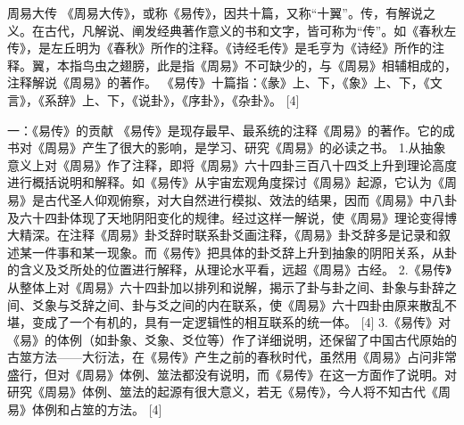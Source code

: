 \documentclass[a4paper,12pt,UTF8,twoside]{ctexbook}
\begin{document}
周易大传
《周易大传》，或称《易传》，因共十篇，又称“十翼”。传，有解说之义。在古代，凡解说、阐发经典著作意义的书和文字，皆可称为“传”。如《春秋左传》，是左丘明为《春秋》所作的注释。《诗经毛传》是毛亨为《诗经》所作的注释。翼，本指鸟虫之翅膀，此是指《周易》不可缺少的，与《周易》相辅相成的，注释解说《周易》的著作。
《易传》十篇指：《彖》上、下，《象》上、下，《文言》，《系辞》上、下，《说卦》，《序卦》，《杂卦》。 [4]

一：《易传》的贡献
《易传》是现存最早、最系统的注释《周易》的著作。它的成书对《周易》产生了很大的影响，是学习、研究《周易》的必读之书。
1.从抽象意义上对《周易》作了注释，即将《周易》六十四卦三百八十四爻上升到理论高度进行概括说明和解释。如《易传》从宇宙宏观角度探讨《周易》起源，它认为《周易》是古代圣人仰观俯察，对大自然进行模拟、效法的结果，因而《周易》中八卦及六十四卦体现了天地阴阳变化的规律。经过这样一解说，使《周易》理论变得博大精深。在注释《周易》卦爻辞时联系卦爻画注释，《周易》卦爻辞多是记录和叙述某一件事和某一现象。而《易传》把具体的卦爻辞上升到抽象的阴阳关系，从卦的含义及爻所处的位置进行解释，从理论水平看，远超《周易》古经。
2.《易传》从整体上对《周易》六十四卦加以排列和说解，揭示了卦与卦之间、卦象与卦辞之间、爻象与爻辞之间、卦与爻之间的内在联系，使《周易》六十四卦由原来散乱不堪，变成了一个有机的，具有一定逻辑性的相互联系的统一体。 [4]
3.《易传》对《易》的体例（如卦象、爻象、爻位等）作了详细说明，还保留了中国古代原始的古筮方法——大衍法，在《易传》产生之前的春秋时代，虽然用《周易》占问非常盛行，但对《周易》体例、筮法都没有说明，而《易传》在这一方面作了说明。对研究《周易》体例、筮法的起源有很大意义，若无《易传》，今人将不知古代《周易》体例和占筮的方法。 [4]
\end{document}
